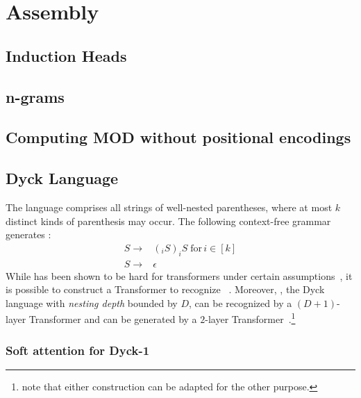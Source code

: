 %
\chapter{Assembly}
%



\section{Induction Heads}


\section{n-grams}


\section{Computing MOD without positional encodings}


\section{Dyck Language}
The language  comprises all strings of well-nested parentheses, where at most $k$ distinct kinds of parenthesis may occur. The following context-free grammar generates :\begin{align*}
    S \rightarrow & (_i S)_iS \; \text{for}\, i \in [k]\\
    S \rightarrow & \epsilon
\end{align*}
While  has been shown to be hard for transformers under certain assumptions~\citep{hahn-2020-theoretical,bhattamishra2020ability}, it is possible to construct a \SMAT Transformer to recognize ~\citet{bhattamishra2020ability}. Moreover, , the Dyck language with \textit{nesting depth} bounded by $D$, can be recognized by a $(D{+}1)$-layer \UHAT Transformer and can be generated by a $2$-layer \SMAT Transformer~\citep{yao2021self}.\footnote{\citet{yao2021self} note that either construction can be adapted for the other purpose.}
\subsection{Soft attention for Dyck-1}

